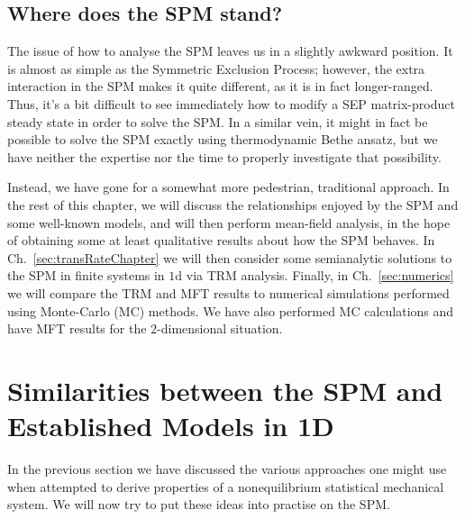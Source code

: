 \subsection{Where does the SPM stand?} \label{sec:spmStatus}
The issue of how to analyse the SPM leaves us in a slightly awkward position. It is almost as simple
as the Symmetric Exclusion Process; however, the extra interaction in the SPM makes it quite
different, as it is in fact longer-ranged. Thus, it's a bit difficult to see immediately how to
modify a SEP matrix-product steady state in order to solve the SPM. In a similar vein, it might 
in fact be possible to solve the SPM exactly using thermodynamic Bethe ansatz, but we have neither
the expertise nor the time to properly investigate that possibility.

Instead, we have gone for a somewhat more pedestrian, traditional approach. In the rest of this
chapter, we will discuss the relationships enjoyed by the SPM and some well-known models,
and will then perform  mean-field analysis, in the hope of obtaining some at least qualitative
results about how the SPM behaves. In Ch.~\ref{sec:transRateChapter} we will then consider some semianalytic solutions to the SPM
in finite systems in $1$d via TRM analysis. Finally, in Ch.~\ref{sec:numerics} we will compare the TRM and MFT results to numerical simulations performed using Monte-Carlo (MC) methods. We have also performed
MC calculations and have MFT results for the $2$-dimensional situation.


\section{Similarities between the SPM and Established Models in 1D}
In the previous section we have discussed the various approaches one might use when attempted to derive properties of a nonequilibrium statistical mechanical system. We will now try to put these ideas into practise on the SPM.



